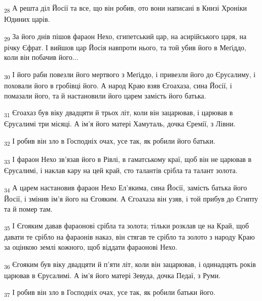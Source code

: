 \begin{tcolorbox}
\textsubscript{28} А решта діл Йосії та все, що він робив, ото вони написані в Книзі Хроніки Юдиних царів.
\end{tcolorbox}
\begin{tcolorbox}
\textsubscript{29} За його днів пішов фараон Нехо, єгипетський цар, на асирійського царя, на річку Єфрат. І вийшов цар Йосія навпроти нього, та той убив його в Меґіддо, коли він побачив його...
\end{tcolorbox}
\begin{tcolorbox}
\textsubscript{30} І його раби повезли його мертвого з Меґіддо, і привезли його до Єрусалиму, і поховали його в гробівці його. А народ Краю взяв Єгоахаза, сина Йосії, і помазали його, та й настановили його царем замість його батька.
\end{tcolorbox}
\begin{tcolorbox}
\textsubscript{31} Єгоахаз був віку двадцяти й трьох літ, коли він зацарював, і царював в Єрусалимі три місяці. А ім'я його матері Хамуталь, дочка Єремії, з Лівни.
\end{tcolorbox}
\begin{tcolorbox}
\textsubscript{32} І робив він зло в Господніх очах, усе так, як робили його батьки.
\end{tcolorbox}
\begin{tcolorbox}
\textsubscript{33} І фараон Нехо зв'язав його в Рівлі, в гаматському краї, щоб він не царював в Єрусалимі, і наклав кару на цей край, сто талантів срібла та талант золота.
\end{tcolorbox}
\begin{tcolorbox}
\textsubscript{34} А царем настановив фараон Нехо Ел'якима, сина Йосії, замість батька його Йосії, і змінив ім'я його на Єгояким. А Єгоахаза він узяв, і той прибув до Єгипту та й помер там.
\end{tcolorbox}
\begin{tcolorbox}
\textsubscript{35} І Єгояким давав фараонові срібла та золота; тільки розклав це на Край, щоб давати те срібло на фараонів наказ, він стягав те срібло та золото з народу Краю за оцінкою землі кожного, щоб віддати фараонові Нехо.
\end{tcolorbox}
\begin{tcolorbox}
\textsubscript{36} Єгояким був віку двадцяти й п'яти літ, коли він зацарював, і одинадцять років царював в Єрусалимі. А ім'я його матері Зевуда, дочка Педаї, з Руми.
\end{tcolorbox}
\begin{tcolorbox}
\textsubscript{37} І робив він зло в Господніх очах, усе так, як робили батьки його.
\end{tcolorbox}
